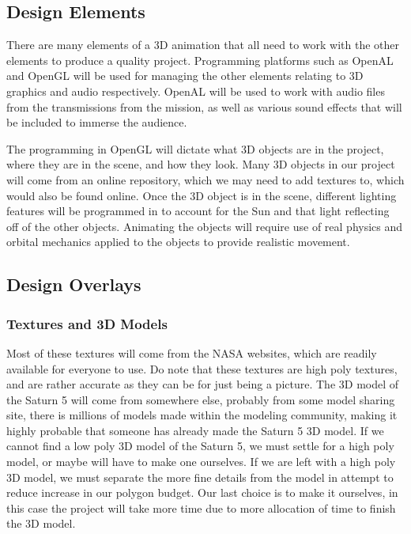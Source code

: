 \documentclass[onecolumn, draftclsnofoot,10pt, compsoc]{IEEEtran}
\begin{document}
    \subsection{Design Elements}
    There are many elements of a 3D animation that all need to work with the other elements to produce a quality project. Programming platforms such as OpenAL and OpenGL will be used for managing the other elements relating to 3D graphics and audio respectively. OpenAL will be used to work with audio files from the transmissions from the mission, as well as various sound effects that will be included to immerse the audience. 
    
    The programming in OpenGL will dictate what 3D objects are in the project, where they are in the scene, and how they look. Many 3D objects in our project will come from an online repository, which we may need to add textures to, which would also be found online. Once the 3D object is in the scene, different lighting features will be programmed in to account for the Sun and that light reflecting off of the other objects. Animating the objects will require use of real physics and orbital mechanics applied to the objects to provide realistic movement. 

    \subsection{Design Overlays} %
	
	\subsubsection{Textures and 3D Models}
	Most of these textures will come from the NASA websites, which are readily available for everyone to use. Do note that these textures are high poly textures, and are rather accurate as they can be for just being a picture. The 3D model of the Saturn 5 will come from somewhere else, probably from some model sharing site, there is millions of models made within the modeling community, making it highly probable that someone has already made the Saturn 5 3D model. If we cannot find a low poly 3D model of the Saturn 5, we must settle for a high poly model, or maybe will have to make one ourselves. If we are left with a high poly 3D model, we must separate the more fine details from the model in attempt to reduce increase in our polygon budget. Our last choice is to make it ourselves, in this case the project will take more time due to more allocation of time to finish the 3D model.
	
\end{document}
